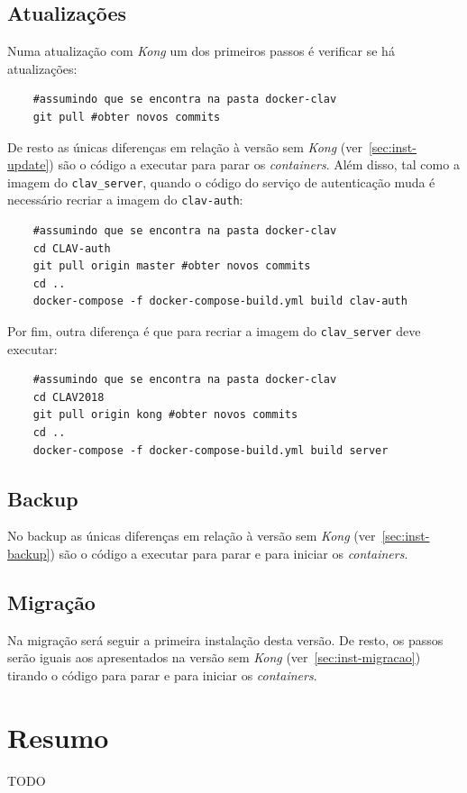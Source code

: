 \subsection{Atualizações}

Numa atualização com \textit{Kong} um dos primeiros passos é verificar se há atualizações:
\footnotesize
\begin{verbatim}
    #assumindo que se encontra na pasta docker-clav
    git pull #obter novos commits
\end{verbatim}
\normalsize

De resto as únicas diferenças em relação à versão sem \textit{Kong} (ver~\ref{sec:inst-update}) são o código a executar para parar os \textit{containers}. Além disso, tal como a imagem do \texttt{clav\_server}, quando o código do serviço de autenticação muda é necessário recriar a imagem do \texttt{clav-auth}:

\footnotesize
\begin{verbatim}
    #assumindo que se encontra na pasta docker-clav
    cd CLAV-auth
    git pull origin master #obter novos commits
    cd ..
    docker-compose -f docker-compose-build.yml build clav-auth
\end{verbatim}
\normalsize

Por fim, outra diferença é que para recriar a imagem do \texttt{clav\_server} deve executar:

\footnotesize
\begin{verbatim}
    #assumindo que se encontra na pasta docker-clav
    cd CLAV2018
    git pull origin kong #obter novos commits
    cd ..
    docker-compose -f docker-compose-build.yml build server
\end{verbatim}
\normalsize

\subsection{Backup}

No backup as únicas diferenças em relação à versão sem \textit{Kong} (ver~\ref{sec:inst-backup}) são o código a executar para parar e para iniciar os \textit{containers}.

\subsection{Migração}

Na migração será seguir a primeira instalação desta versão. De resto, os passos serão iguais aos apresentados na versão sem \textit{Kong} (ver~\ref{sec:inst-migracao}) tirando o código para parar e para iniciar os \textit{containers}.

\section{Resumo}

TODO
